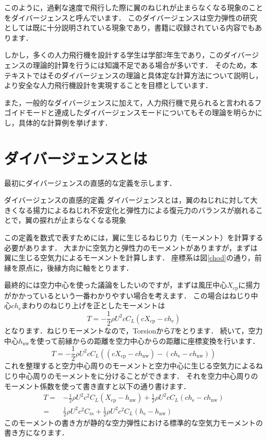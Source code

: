\documentclass{jarticle}
\begin{document}
このように，過剰な速度で飛行した際に翼のねじれが止まらなくなる現象のことをダイバージェンスと呼んでいます．
このダイバージェンスは空力弾性の研究としては既に十分説明されている現象であり，書籍に収録されている内容でもあります\cite{2019}．

しかし，多くの人力飛行機を設計する学生は学部2年生であり，このダイバージェンスの理論的計算を行うには知識不足である場合が多いです．
そのため，本テキストではそのダイバージェンスの理論と具体定な計算方法について説明し，より安全な人力飛行機設計を実現することを目標としています．

また，一般的なダイバージェンスに加えて，人力飛行機で見られると言われるフゴイドモードと連成したダイバージェンスモード\cite{takasaki}についてもその理論を明らかにし，具体的な計算例を挙げます．




\section{ダイバージェンスとは}

最初にダイバージェンスの直感的な定義を示します．
\begin{itembox}[l]{ダイバージェンスの直感的定義}
    ダイバージェンスとは，翼のねじれに対して大きくなる揚力によるねじれ不安定化と弾性力による復元力のバランスが崩れることで，翼の捩れが止まらなくなる現象
\end{itembox}

この定義を数式で表すためには，翼に生じるねじり力（モーメント）を計算する必要があります．
大まかに空気力と弾性力のモーメントがありますが，まずは翼に生じる空気力によるモーメントを計算します．
座標系は図\ref{chod}の通り，前縁を原点に，後縁方向に軸をとります．

最終的には空力中心を使った議論をしたいのですが，まずは風圧中心$X_\mathrm{cp}$に揚力がかかっているという一番わかりやすい場合を考えます．
この場合はねじり中心$ch_\mathrm{e}$まわりのねじり上げを正としたモーメントは
\begin{equation}
    T = -\frac{1}{2}\rho U^2 c C_L (cX_\mathrm{cp} - ch_\mathrm{e})
\end{equation}
となります．ねじりモーメントなので，Torsionから$T$をとります．
続いて，空力中心$h_\mathrm{nw}$を使って前縁からの距離を空力中心からの距離に座標変換を行います．
\begin{equation}
    T = -\frac{1}{2}\rho U^2 c C_L ((cX_\mathrm{cp}-ch_\mathrm{nw}) - (ch_\mathrm{e}-ch_\mathrm{nw}))
\end{equation}
これを整理すると空力中心周りのモーメントと空力中心に生じる空気力によるねじり中心周りのモーメントをに分けることができます．
それを空力中心周りのモーメント係数を使って書き直すと以下の通り書けます．
\begin{equation}
    \begin{split}
        T =& -\frac{1}{2}\rho U^2 c^2 C_L (X_\mathrm{cp}-h_\mathrm{nw}) + \frac{1}{2}\rho U^2 c C_L  (ch_\mathrm{e}-ch_\mathrm{nw}) \\
          =& \frac{1}{2}\rho U^2 c^2 C_m + \frac{1}{2}\rho U^2 c^2 C_L  (h_\mathrm{e}-h_\mathrm{nw})
    \end{split}
\end{equation}
このモーメントの書き方が静的な空力弾性における標準的な空気力モーメントの書き方になります．
\end{document}
